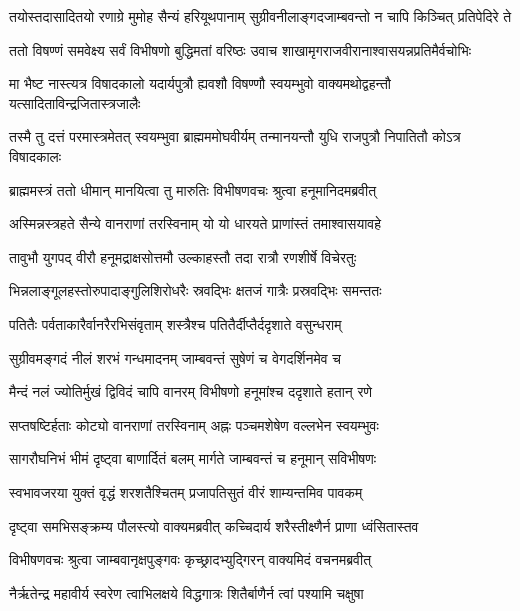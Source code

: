 
\twolineshloka
{तयोस्तदासादितयो रणाग्रे मुमोह सैन्यं हरियूथपानाम्}
{सुग्रीवनीलाङ्गदजाम्बवन्तो न चापि किञ्चित् प्रतिपेदिरे ते} %

\twolineshloka
{ततो विषण्णं समवेक्ष्य सर्वं विभीषणो बुद्धिमतां वरिष्ठः}
{उवाच शाखामृगराजवीरानाश्वासयन्नप्रतिमैर्वचोभिः} %

\twolineshloka
{मा भैष्ट नास्त्यत्र विषादकालो यदार्यपुत्रौ ह्यवशौ विषण्णौ}
{स्वयम्भुवो वाक्यमथोद्वहन्तौ यत्सादिताविन्द्रजितास्त्रजालैः} %

\twolineshloka
{तस्मै तु दत्तं परमास्त्रमेतत् स्वयम्भुवा ब्राह्मममोघवीर्यम्}
{तन्मानयन्तौ युधि राजपुत्रौ निपातितौ कोऽत्र विषादकालः} %

\twolineshloka
{ब्राह्ममस्त्रं ततो धीमान् मानयित्वा तु मारुतिः}
{विभीषणवचः श्रुत्वा हनूमानिदमब्रवीत्} %

\twolineshloka
{अस्मिन्नस्त्रहते सैन्ये वानराणां तरस्विनाम्}
{यो यो धारयते प्राणांस्तं तमाश्वासयावहे} %

\twolineshloka
{तावुभौ युगपद् वीरौ हनूमद्राक्षसोत्तमौ}
{उल्काहस्तौ तदा रात्रौ रणशीर्षे विचेरतुः} %

\twolineshloka
{भिन्नलाङ्गूलहस्तोरुपादाङ्गुलिशिरोधरैः}
{स्रवद्भिः क्षतजं गात्रैः प्रस्रवद्भिः समन्ततः} %

\twolineshloka
{पतितैः पर्वताकारैर्वानरैरभिसंवृताम्}
{शस्त्रैश्च पतितैर्दीप्तैर्ददृशाते वसुन्धराम्} %

\twolineshloka
{सुग्रीवमङ्गदं नीलं शरभं गन्धमादनम्}
{जाम्बवन्तं सुषेणं च वेगदर्शिनमेव च} %

\twolineshloka
{मैन्दं नलं ज्योतिर्मुखं द्विविदं चापि वानरम्}
{विभीषणो हनूमांश्च ददृशाते हतान् रणे} %

\twolineshloka
{सप्तषष्टिर्हताः कोट्यो वानराणां तरस्विनाम्}
{अह्नः पञ्चमशेषेण वल्लभेन स्वयम्भुवः} %

\twolineshloka
{सागरौघनिभं भीमं दृष्ट्वा बाणार्दितं बलम्}
{मार्गते जाम्बवन्तं च हनूमान् सविभीषणः} %

\twolineshloka
{स्वभावजरया युक्तं वृद्धं शरशतैश्चितम्}
{प्रजापतिसुतं वीरं शाम्यन्तमिव पावकम्} %

\twolineshloka
{दृष्ट्वा समभिसङ्क्रम्य पौलस्त्यो वाक्यमब्रवीत्}
{कच्चिदार्य शरैस्तीक्ष्णैर्न प्राणा ध्वंसितास्तव} %

\twolineshloka
{विभीषणवचः श्रुत्वा जाम्बवानृक्षपुङ्गवः}
{कृच्छ्रादभ्युद्गिरन् वाक्यमिदं वचनमब्रवीत्} %

\twolineshloka
{नैर्ऋतेन्द्र महावीर्य स्वरेण त्वाभिलक्षये}
{विद्धगात्रः शितैर्बाणैर्न त्वां पश्यामि चक्षुषा} %

